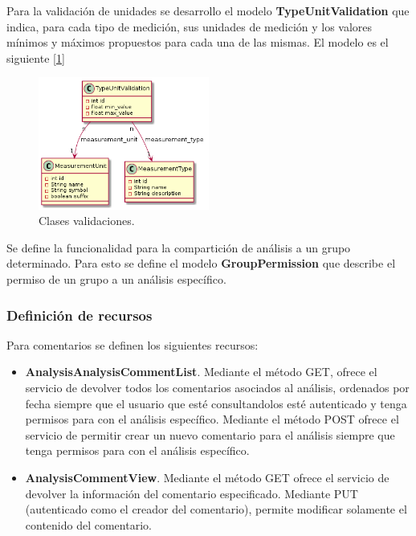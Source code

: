 Para la validación de unidades se desarrollo el modelo \textbf{TypeUnitValidation} que indica, para cada tipo de medición, sus unidades de medición y los valores mínimos y máximos propuestos para cada una de las mismas. El modelo es el siguiente [\ref{9-validaciones}]

	\begin{figure}[h]
        \centering
        \includegraphics[width=0.5\textwidth]{img/dc_validaciones}
        \caption{Clases validaciones.}
		\label{9-validaciones}
    \end{figure}

Se define la funcionalidad para la compartición de análisis a un grupo determinado. Para esto se define el modelo \textbf{GroupPermission} que describe el permiso de un grupo a un análisis específico.

\subsubsection{Definición de recursos}

Para comentarios se definen los siguientes recursos:
\begin{itemize}
	\item \textbf{AnalysisAnalysisCommentList}. Mediante el método GET, ofrece el servicio de devolver todos los comentarios asociados al análisis, ordenados por fecha  siempre que el usuario que esté consultandolos esté autenticado y tenga permisos para con el análisis específico. Mediante el método POST ofrece el servicio de permitir crear un nuevo comentario para el análisis siempre que tenga permisos para con el análisis específico.
	\item \textbf{AnalysisCommentView}. Mediante el método GET ofrece el servicio de devolver la información del comentario especificado. Mediante PUT (autenticado como el creador del comentario), permite modificar solamente el contenido del comentario.
\end{itemize}


